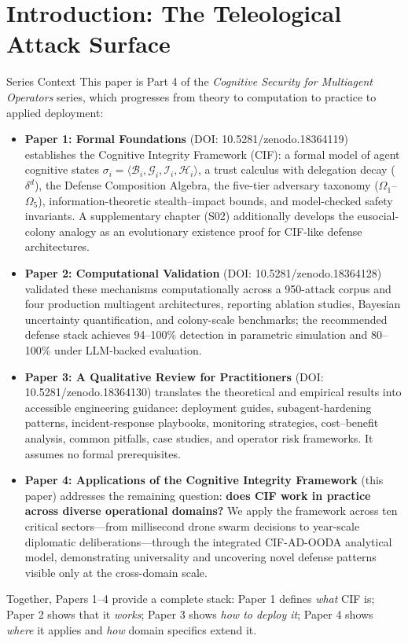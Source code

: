 \documentclass[
  ignorenonframetext,
]{beamer}
\author{\texorpdfstring{}{}}
\date{}
\providecommand{\tightlist}{%
  \setlength{\itemsep}{0pt}\setlength{\parskip}{0pt}}
\begin{document}
\section{Introduction: The Teleological Attack
Surface}\label{introduction-the-teleological-attack-surface}

\begin{frame}[allowframebreaks]{Series Context}
\protect{}\label{series-context}
This paper is Part 4 of the \emph{Cognitive Security for Multiagent
Operators} series, which progresses from theory to computation to
practice to applied deployment:

\begin{itemize}
\tightlist
\item
  \textbf{Paper 1: Formal Foundations} \cite{friedman2026cogsec1} (DOI:
  10.5281/zenodo.18364119) establishes the Cognitive Integrity Framework
  (CIF): a formal model of agent cognitive states
  \(\sigma_i = \langle \mathcal{B}_i, \mathcal{G}_i, \mathcal{I}_i, \mathcal{H}_i \rangle\),
  a trust calculus with delegation decay (\(\delta^d\)), the Defense
  Composition Algebra, the five-tier adversary taxonomy
  (\(\Omega_1\)--\(\Omega_5\)), information-theoretic stealth--impact
  bounds, and model-checked safety invariants. A supplementary chapter
  (S02) additionally develops the eusocial-colony analogy as an
  evolutionary existence proof for CIF-like defense architectures.
\item
  \textbf{Paper 2: Computational Validation} \cite{friedman2026cogsec2}
  (DOI: 10.5281/zenodo.18364128) validated these mechanisms
  computationally across a 950-attack corpus and four production
  multiagent architectures, reporting ablation studies, Bayesian
  uncertainty quantification, and colony-scale benchmarks; the
  recommended defense stack achieves 94--100\% detection in parametric
  simulation and 80--100\% under LLM-backed evaluation.
\item
  \textbf{Paper 3: A Qualitative Review for Practitioners}
  \cite{friedman2026cogsec3} (DOI: 10.5281/zenodo.18364130) translates
  the theoretical and empirical results into accessible engineering
  guidance: deployment guides, subagent-hardening patterns,
  incident-response playbooks, monitoring strategies, cost--benefit
  analysis, common pitfalls, case studies, and operator risk frameworks.
  It assumes no formal prerequisites.
\item
  \textbf{Paper 4: Applications of the Cognitive Integrity Framework}
  (this paper) addresses the remaining question: \textbf{does CIF work
  in practice across diverse operational domains?} We apply the
  framework across ten critical sectors---from millisecond drone swarm
  decisions to year-scale diplomatic deliberations---through the
  integrated CIF-AD-OODA analytical model, demonstrating universality
  and uncovering novel defense patterns visible only at the cross-domain
  scale.
\end{itemize}

Together, Papers 1--4 provide a complete stack: Paper 1 defines
\emph{what} CIF is; Paper 2 shows that it \emph{works}; Paper 3 shows
\emph{how to deploy it}; Paper 4 shows \emph{where} it applies and
\emph{how} domain specifics extend it.
\end{frame}
\end{document}

